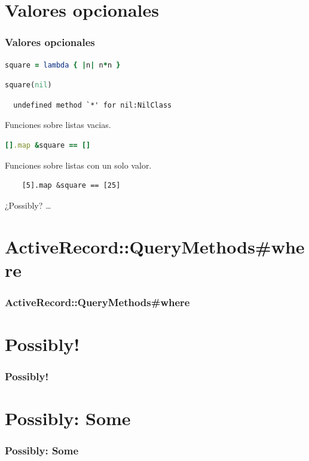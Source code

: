 \documentclass{beamer}
\begin{document}
\section{Valores opcionales}
\begin{frame}[fragile]
  \frametitle{Valores opcionales}

  \begin{lstlisting}[language=Ruby]
    square = lambda { |n| n*n }
  \end{lstlisting}
  \begin{lstlisting}[language=Ruby]
    square(nil)
  \end{lstlisting}

  \begin{verbatim}
  undefined method `*' for nil:NilClass
  \end{verbatim}

  Funciones sobre listas vacias.
  \begin{lstlisting}[language=Ruby]
    [].map &square == []
  \end{lstlisting}
  Funciones sobre listas con un solo valor.
  \begin{lstlisting}
    [5].map &square == [25]
  \end{lstlisting}
  ¿Possibly? \ldots
\end{frame}

\section{ActiveRecord::QueryMethods\#where}
\begin{frame}[fragile]
  \frametitle{ActiveRecord::QueryMethods\#where}
  
\end{frame}

\section{Possibly!}
\begin{frame}[fragile]
  \frametitle{Possibly!}
  
\end{frame}

\section{Possibly: Some}
\begin{frame}[fragile]
  \frametitle{Possibly: Some}
  
\end{frame}
\end{document}
